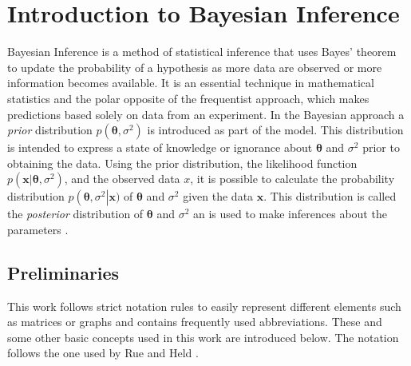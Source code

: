 %
\chapter{Introduction to Bayesian Inference}
\label{sec:bayes}
Bayesian Inference is a method of statistical inference that uses Bayes' theorem to update the probability of a hypothesis as more data are observed or more information becomes available. It is an essential technique in mathematical statistics and the polar opposite of the frequentist approach, which makes predictions based solely on data from an experiment. In the Bayesian approach a \textit{prior} distribution $p\left(\pmb{\theta}, \sigma^2\right)$ is introduced as part of the model. This distribution is intended to express a state of knowledge or ignorance about $\pmb{\theta}$ and $\sigma^2$ prior to obtaining the data. Using the prior distribution, the likelihood function $p\left(\pmb{x}|\pmb{\theta},\sigma^2\right)$, and the observed data $x$, it is possible to calculate the probability distribution $p\left(\pmb{\theta},\sigma^2\right|\pmb{x})$ of $\pmb{\theta}$ and $\sigma^2$ given the data $\pmb{x}$. This distribution is called the \textit{posterior} distribution of $\pmb{\theta}$ and $\sigma^2$ an is used to make inferences about the parameters \autocite[][6]{box2011bayesian}.
\section{Preliminaries}
This work follows strict notation rules to easily represent different elements such as matrices or graphs and contains frequently used abbreviations. These and some other basic concepts used in this work are introduced below. The notation follows the one used by Rue and Held \autocite[][14--19]{rue2005gaussian}.
